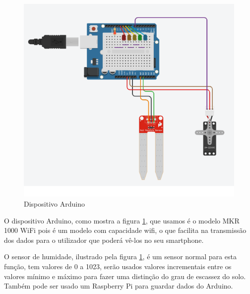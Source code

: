 \documentclass[conference]{IEEEtran}
\begin{document}
\begin{figure}
    \centering
    \includegraphics[scale=0.5]{soil_moisture_circuit_schema.png}
    \caption{Dispositivo Arduino}
    \label{fig:my_label1}
\end{figure}

O dispositivo Arduino, como mostra a figura \ref{fig:my_label1}, que usamos é o 
modelo MKR 1000 WiFi pois é um modelo com capacidade wifi, o que facilita na 
transmissão dos dados para o utilizador que poderá vê-los no seu smartphone. 

O sensor de humidade, ilustrado pela figura \ref{fig:my_label1}, é um 
sensor normal para esta função, tem valores de 0 a 1023, serão usados valores 
incrementais entre os valores mínimo e máximo para fazer uma distinção do grau 
de escassez do solo. Também pode ser usado um Raspberry Pi para guardar dados do Arduino.











\end{document}
